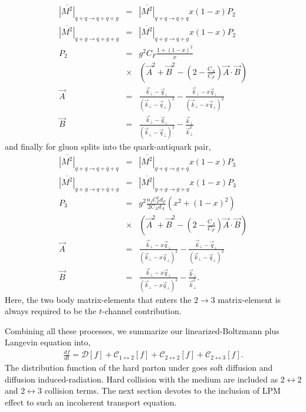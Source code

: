 \documentclass[aps, prc, reprint, amsmath, groupedaddress, nofootinbib]{revtex4-1}
\begin{document}
\begin{eqnarray}
\overline{|M^2|}_{q+q\rightarrow q+q+g} &=& \overline{|M^2|}_{q+q\rightarrow q+q} x(1-x) P_2\\
\overline{|M^2|}_{q+g\rightarrow q+g+g} &=& \overline{|M^2|}_{q+g\rightarrow q+g} x(1-x) P_2\\
P_2 &=& g^2 C_F\frac{1+(1-x)^2}{x}  \\\nonumber
&\times&\left(\vec{A}^2 + \vec{B}^2 - \left(2-\frac{C_A}{C_F}\right)\vec{A}\cdot\vec{B}\right)\\
\vec{A} &=& \frac{\vec{k}_\perp - \vec{q}_\perp}{(\vec{k}_\perp - \vec{q}_\perp)^2} -  \frac{\vec{k}_\perp - x\vec{q}_\perp}{(\vec{k}_\perp - x\vec{q}_\perp)^2} \\
\vec{B} &=& \frac{\vec{k}_\perp - \vec{q}_\perp}{(\vec{k}_\perp - \vec{q}_\perp)^2} -  \frac{\vec{k}_\perp}{\vec{k}_\perp^2}
\end{eqnarray}
and finally for gluon splits into the quark-antiquark pair,
\begin{eqnarray}
\overline{|M^2|}_{g+q\rightarrow q+\bar{q}+q} &=& \overline{|M^2|}_{g+q\rightarrow g+q} x(1-x) P_3\\
\overline{|M^2|}_{g+g\rightarrow q+\bar{q}+g} &=& \overline{|M^2|}_{g+g\rightarrow g+g} x(1-x) P_3\\
P_3 &=& g^2 \frac{n_f C_F^2 d_F}{2C_A d_A}(x^2+(1-x)^2) \\\nonumber
&\times&\left(\vec{A}^2 + \vec{B}^2 - \left(2- \frac{C_A}{C_F}\right)\vec{A}\cdot\vec{B}\right)\\
\vec{A} &=& \frac{\vec{k}_\perp - x\vec{q}_\perp}{(\vec{k}_\perp - x\vec{q}_\perp)^2} -  \frac{\vec{k}_\perp - \vec{q}_\perp}{(\vec{k}_\perp - \vec{q}_\perp)^2} \\
\vec{B} &=& \frac{\vec{k}_\perp - x\vec{q}_\perp}{(\vec{k}_\perp - x\vec{q}_\perp)^2} -  \frac{\vec{k}_\perp}{\vec{k}_\perp^2}.
\end{eqnarray}
Here, the two body matrix-elements that enters the $2\rightarrow 3$ matrix-element is always required to be the $t$-channel contribution.

Combining all these processes, we summarize our linearized-Boltzmann plus Langevin equation into,
\begin{eqnarray}
\frac{df}{dt} = \mathcal{D}[f] + \mathcal{C}_{1\leftrightarrow 2}[f] + \mathcal{C}_{2\leftrightarrow 2}[f] + \mathcal{C}_{2\leftrightarrow 3}[f].
\end{eqnarray}
The distribution function of the hard parton under goes soft diffusion and diffusion induced-radiation. 
Hard collision with the medium are included as $2\leftrightarrow 2$ and $2\leftrightarrow 3$ collision terms.
The next section devotes to the inclusion of LPM effect to such an incoherent transport equation.
\end{document}
